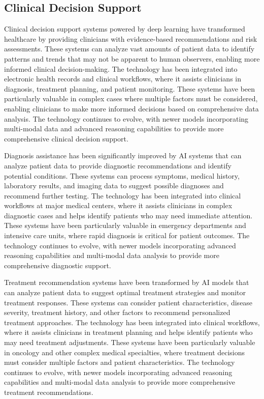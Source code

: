 \subsection{Clinical Decision Support}

Clinical decision support systems powered by deep learning have transformed healthcare by providing clinicians with evidence-based recommendations and risk assessments. These systems can analyze vast amounts of patient data to identify patterns and trends that may not be apparent to human observers, enabling more informed clinical decision-making. The technology has been integrated into electronic health records and clinical workflows, where it assists clinicians in diagnosis, treatment planning, and patient monitoring. These systems have been particularly valuable in complex cases where multiple factors must be considered, enabling clinicians to make more informed decisions based on comprehensive data analysis. The technology continues to evolve, with newer models incorporating multi-modal data and advanced reasoning capabilities to provide more comprehensive clinical decision support.

Diagnosis assistance has been significantly improved by AI systems that can analyze patient data to provide diagnostic recommendations and identify potential conditions. These systems can process symptoms, medical history, laboratory results, and imaging data to suggest possible diagnoses and recommend further testing. The technology has been integrated into clinical workflows at major medical centers, where it assists clinicians in complex diagnostic cases and helps identify patients who may need immediate attention. These systems have been particularly valuable in emergency departments and intensive care units, where rapid diagnosis is critical for patient outcomes. The technology continues to evolve, with newer models incorporating advanced reasoning capabilities and multi-modal data analysis to provide more comprehensive diagnostic support.

Treatment recommendation systems have been transformed by AI models that can analyze patient data to suggest optimal treatment strategies and monitor treatment responses. These systems can consider patient characteristics, disease severity, treatment history, and other factors to recommend personalized treatment approaches. The technology has been integrated into clinical workflows, where it assists clinicians in treatment planning and helps identify patients who may need treatment adjustments. These systems have been particularly valuable in oncology and other complex medical specialties, where treatment decisions must consider multiple factors and patient characteristics. The technology continues to evolve, with newer models incorporating advanced reasoning capabilities and multi-modal data analysis to provide more comprehensive treatment recommendations.

